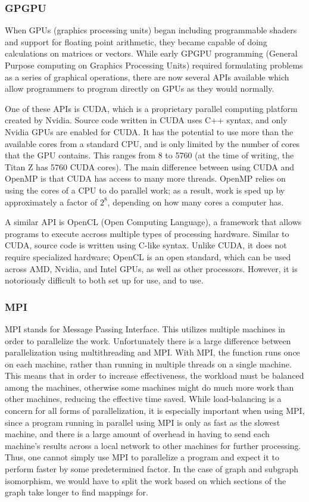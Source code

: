 \documentclass{article}
\begin{document}
    \subsubsection{GPGPU}
    When GPUs (graphics processing units) began including programmable shaders and support for floating point arithmetic, they became capable of doing calculations on matrices or vectors. While early GPGPU programming (General Purpose computing on Graphics Processing Units) required formulating problems as a series of graphical operations, there are now several APIs available which allow programmers to program directly on GPUs as they would normally.

    One of these APIs is CUDA, which is a proprietary parallel computing platform created by Nvidia. Source code written in CUDA uses C++ syntax, and only Nvidia GPUs are enabled for CUDA. It has the potential to use more than the available cores from a standard CPU, and is only limited by the number of cores that the GPU contains. This ranges from 8 to 5760 (at the time of writing, the Titan Z has 5760 CUDA cores). The main difference between using CUDA and OpenMP is that CUDA has access to many more threads. OpenMP relies on using the cores of a CPU to do parallel work; as a result, work is sped up by approximately a factor of $2^8$, depending on how many cores a computer has.

    A similar API is OpenCL (Open Computing Language), a framework that allows programs to execute accross multiple types of processing hardware. Similar to CUDA, source code is written using C-like syntax. Unlike CUDA, it does not require specialized hardware; OpenCL is an open standard, which can be used across AMD, Nvidia, and Intel GPUs, as well as other processors. However, it is notoriously difficult to both set up for use, and to use.

    \subsubsection{MPI}
    MPI stands for Message Passing Interface. This utilizes multiple machines in order to parallelize the work. Unfortunately there is a large difference between parallelization using multithreading and MPI. With MPI, the function runs once on each machine, rather than running in multiple threads on a single machine. This means that in order to increase effectiveness, the workload must be balanced among the machines, otherwise some machines might do much more work than other machines, reducing the effective time saved. While load-balancing is a concern for all forms of parallelization, it is especially important when using MPI, since a program running in parallel using MPI is only as fast as the slowest machine, and there is a large amount of overhead in having to send each machine's results across a local network to other machines for further processing. Thus, one cannot simply use MPI to parallelize a program and expect it to perform faster by some predetermined factor. In the case of graph and subgraph isomorphism, we would have to split the work based on which sections of the graph take longer to find mappings for.
\end{document}
